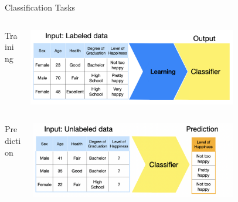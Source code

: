 \documentclass[11pt,compress,t,notes=noshow, xcolor=table]{beamer}
\begin{document}
\begin{vbframe}{Classification Tasks}
\begin{columns}  
\begin{column}{0.1\textwidth} 
\begin{center}
Training
\end{center}
\end{column}
\begin{column}{0.9\textwidth} 
\begin{center}
  \includegraphics[width = 0.75\textwidth]{slides/supervised-classification/figure_man/nutshell-classification-training-task.png}
\end{center}
\end{column}
\end{columns}
\begin{columns}
\begin{column}{0.1\textwidth} 
\begin{center}
Prediction
\end{center}
\end{column}
\begin{column}{0.9\textwidth} 
\begin{center}
  \includegraphics[width = 0.75\textwidth]{slides/supervised-classification/figure_man/nutshell-classification-prediction-task.png} 
\end{center}
\end{column}
\end{columns}
\end{vbframe}
\end{document}
